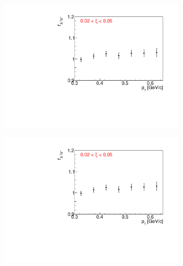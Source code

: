 \captionsetup{format=default,indention=0pt,justification=justified}
\begin{figure}[h!]
	\centering
	\begin{subfigure}{.32\textwidth}
		\includegraphics[width=\linewidth, page=3]{chapters/chrgSTAR/img/dEdx/fit2019_fitResult_1_0_step_0.pdf}
	\end{subfigure}
	\begin{subfigure}{.32\textwidth}
		\includegraphics[width=\linewidth, page=4]{chapters/chrgSTAR/img/dEdx/fit2019_fitResult_1_0_step_0.pdf}
	\end{subfigure}
	\begin{subfigure}{.32\textwidth}

\end{subfigure}
\end{figure}

